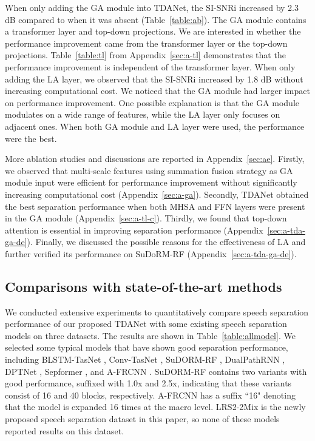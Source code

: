 \documentclass{article} \usepackage{iclr2023_conference,times}
\begin{document}
When only adding the GA module into TDANet, the SI-SNRi increased by 2.3 dB compared to when it was absent (Table~\ref{table:ab}). The GA module contains a transformer layer and top-down projections. We are interested in whether the performance improvement came from the transformer layer or the top-down projections. Table~\ref{table:tl} from Appendix~\ref{sec:a-tl} demonstrates that the performance improvement is independent of the transformer layer. When only adding the LA layer, we observed that the SI-SNRi increased by 1.8 dB without increasing computational cost. We noticed that the GA module had larger impact on performance improvement. One possible explanation is that the GA module modulates on a wide range of features, while the LA layer only focuses on adjacent ones. When both GA module and LA layer were used, the performance were the best.










More ablation studies and discussions are reported in Appendix~\ref{sec:ae}. Firstly, we observed that multi-scale features using summation fusion strategy as GA module input were efficient for performance improvement without significantly increasing computational cost (Appendix~\ref{sec:a-ga}). Secondly, TDANet obtained the best separation performance when both MHSA and FFN layers were present in the GA module (Appendix~\ref{sec:a-tl-c}). Thirdly, we found that top-down attention is essential in improving separation performance (Appendix~\ref{sec:a-tda-ga-de}). Finally, we discussed the possible reasons for the effectiveness of LA and further verified its performance on SuDoRM-RF (Appendix~\ref{sec:a-tda-ga-de}).




\subsection{Comparisons with state-of-the-art methods}

We conducted extensive experiments to quantitatively compare speech separation performance of our proposed TDANet with some existing speech separation models on three datasets. The results are shown in Table~\ref{table:allmodel}. We selected some typical models that have shown good separation performance, including BLSTM-TasNet \citep{luo2018tasnet}, Conv-TasNet \citep{luo2019conv}, SuDORM-RF \citep{tzinis2020sudo}, DualPathRNN \citep{luo2020dual}, DPTNet \citep{Chen2020}, Sepformer \citep{subakan2021attention}, and A-FRCNN \citep{hu2021speech}. SuDORM-RF contains two variants with good performance, suffixed with 1.0x and 2.5x, indicating that these variants consist of 16 and 40 blocks, respectively. A-FRCNN has a suffix ``16" denoting that the model is expanded 16 times at the macro level. LRS2-2Mix is the newly proposed speech separation dataset in this paper, so none of these models reported results on this dataset.
\end{document}

